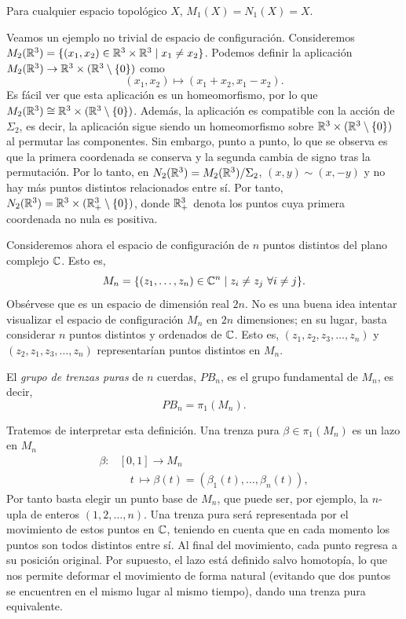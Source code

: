 \documentclass[TFG.tex]{subfiles}
\begin{document}
\begin{observacion}
Para cualquier espacio topológico $X$, $M_1(X)=N_1(X)=X$.
\end{observacion}

\begin{ej}
Veamos un ejemplo no trivial de espacio de configuración. Consideremos $M_2(\mathbb{R}^3)=\{(x_1,x_2)\in\mathbb{R}^3\times\mathbb{R}^3\mid x_1\neq x_2\}$. Podemos definir la aplicación $M_2(\mathbb{R}^3)\to \mathbb{R}^3\times(\mathbb{R}^3\setminus\{0\})$ como
\[
(x_1,x_2)\mapsto (x_1+x_2,x_1-x_2).
\]
Es fácil ver que esta aplicación es un homeomorfismo, por lo que $M_2(\mathbb{R}^3)\cong \mathbb{R}^3\times(\mathbb{R}^3\setminus\{0\})$. Además, la aplicación es compatible con la acción de $\Sigma_2$, es decir, la aplicación sigue siendo un homeomorfismo sobre $\mathbb{R}^3\times(\mathbb{R}^3\setminus\{0\})$ al permutar las componentes. Sin embargo, punto a punto, lo que se observa es que la primera coordenada se conserva y la segunda cambia de signo tras la permutación. Por lo tanto, en $N_2(\mathbb{R}^3)=M_2(\mathbb{R}^3)/\Sigma_2$, $(x,y)\sim (x,-y)$ y no hay más puntos distintos relacionados entre sí. Por tanto, $N_2(\mathbb{R}^3)=\mathbb{R}^3\times(\mathbb{R}^3_{+}\setminus\{0\})$, donde $\mathbb{R}^3_{+}$ denota los puntos cuya primera coordenada no nula es positiva.

\end{ej}


Consideremos ahora el espacio de configuración de $n$ puntos distintos del plano complejo $\mathbb{C}$. Esto es,
$$M_n=\{(z_1,\dots,z_n)\in\C^n\mid z_i\neq z_j\ \forall i\neq j\}.$$ 
Obsérvese que es un espacio de dimensión real $2n$. No es una buena idea intentar visualizar el espacio de configuración $M_n$ en $2n$ dimensiones; en su lugar, basta considerar $n$ puntos distintos y ordenados de $\mathbb{C}$. Esto es, $(z_1,z_2,z_3,\dots, z_n)$ y $(z_2,z_1,z_3,\dots, z_n)$ representarían puntos distintos en $M_n$. 
\begin{defi}
El \emph{grupo de trenzas puras} de $n$ cuerdas, $PB_n$, es el grupo fundamental de $M_n$, es decir,
$$PB_n=\pi_1(M_n).$$
\end{defi}

Tratemos de interpretar esta definición. Una trenza pura $\beta\in\pi_1(M_n)$ es un lazo en $M_n$
\begin{align*}
\beta: & [0,1]\to M_n\\
& \quad t\ \mapsto \beta(t)= (\beta_1(t),\dots, \beta_n(t)),
\end{align*}
Por tanto basta elegir un punto base de $M_n$, que puede ser, por ejemplo, la $n$-upla de enteros $(1,2,\dots, n)$. Una trenza pura será representada por el movimiento de estos puntos en $\mathbb{C}$, teniendo en cuenta que en cada momento los puntos son todos distintos entre sí. Al final del movimiento, cada punto regresa a su posición original. Por supuesto, el lazo está definido salvo homotopía, lo que nos permite deformar el movimiento de forma natural (evitando que dos puntos se encuentren en el mismo lugar al mismo tiempo), dando una trenza pura equivalente.
\end{document}
